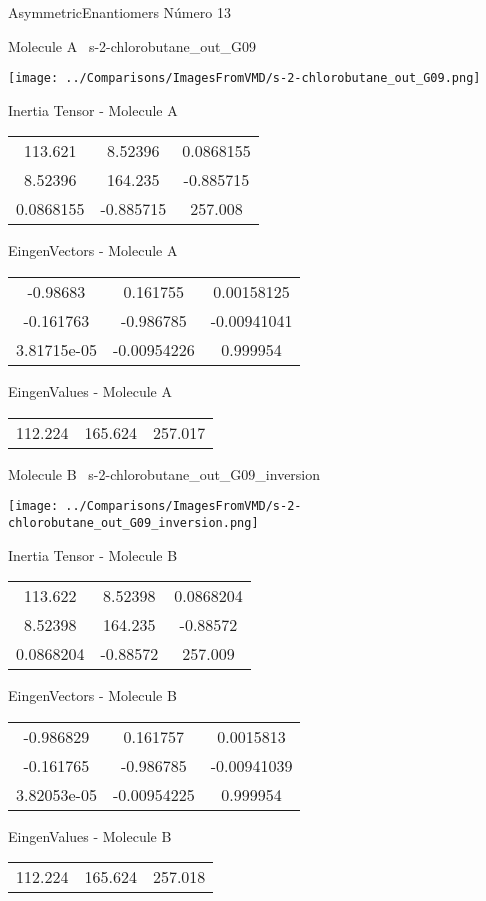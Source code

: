 \vtab[-3cm]
\begin{center}
{\large AsymmetricEnantiomers \tab Número 13}
\end{center}
\begin{multicols}{2}
\begin{center}

Molecule A \
s-2-chlorobutane\_out\_G09

\texttt{[image: ../Comparisons/ImagesFromVMD/s-2-chlorobutane\_out\_G09.png]}

Inertia Tensor - Molecule A \\
\begin{tabular}{|c c c|}
113.621	 & 	8.52396	 & 	0.0868155	 \\
8.52396	 & 	164.235	 & 	-0.885715	 \\
0.0868155	 & 	-0.885715	 & 	257.008
\end{tabular}

\vtab
 EingenVectors - Molecule A     \\
\begin{tabular}{|c c c|}
-0.98683	 & 	0.161755	 & 	0.00158125	 \\
-0.161763	 & 	-0.986785	 & 	-0.00941041	 \\
3.81715e-05	 & 	-0.00954226	 & 	0.999954
\end{tabular}

\vtab
 EingenValues - Molecule A     \\
\begin{tabular}{|c c c|}
112.224	 & 	165.624	 & 	257.017	 \\
\end{tabular}
\columnbreak

Molecule B \
s-2-chlorobutane\_out\_G09\_inversion

\texttt{[image: ../Comparisons/ImagesFromVMD/s-2-chlorobutane\_out\_G09\_inversion.png]}

Inertia Tensor - Molecule B \\
\begin{tabular}{|c c c|}
113.622	 & 	8.52398	 & 	0.0868204	 \\
8.52398	 & 	164.235	 & 	-0.88572	 \\
0.0868204	 & 	-0.88572	 & 	257.009
\end{tabular}

\vtab
 EingenVectors - Molecule B     \\
\begin{tabular}{|c c c|}
-0.986829	 & 	0.161757	 & 	0.0015813	 \\
-0.161765	 & 	-0.986785	 & 	-0.00941039	 \\
3.82053e-05	 & 	-0.00954225	 & 	0.999954
\end{tabular}

\vtab
 EingenValues - Molecule B     \\
\begin{tabular}{|c c c|}
112.224	 & 	165.624	 & 	257.018	 \\
\end{tabular}

\end{center}
\end{multicols}

